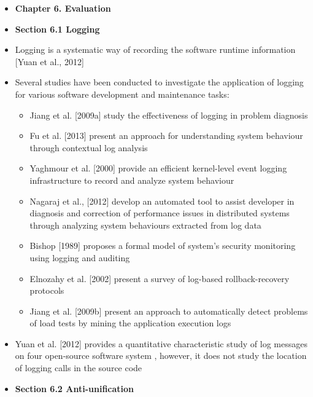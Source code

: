 \documentclass{article}
\newcommand{\bold}{\textbf}
\begin{document}
\begin{itemize} [leftmargin=.1in]
\item \bold{Chapter 6. Evaluation}
\item \bold{Section 6.1 Logging}
\item Logging is a systematic way of recording the software runtime information [Yuan et al., 2012]
\item Several studies have been conducted to investigate the application of logging for various software development and maintenance tasks:
\begin{itemize}
\item Jiang et al. [2009a] study the effectiveness of logging in problem diagnosis
\item Fu et al. [2013] present an approach for understanding system behaviour through contextual log analysis
\item Yaghmour et al. [2000] provide an efficient kernel-level event logging infrastructure to record and analyze system behaviour
\item Nagaraj et al., [2012] develop an automated tool to assist developer in diagnosis and correction of performance issues in distributed systems through analyzing system behaviours extracted from log data
\item Bishop [1989] proposes a formal model of system’s security monitoring using logging and auditing
\item Elnozahy et al. [2002] present a survey of log-based rollback-recovery protocols
\item Jiang et al. [2009b] present an approach to automatically detect problems of load tests by mining the application execution logs
\end{itemize}
\item Yuan et al. [2012]  provides a quantitative  characteristic study of log messages on four open-source software system , however, it does not study the location of logging calls in the source code  

\item \bold{Section 6.2 Anti-unification}


\end{itemize}
\end{document}
